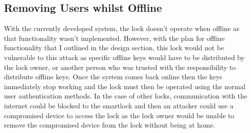 \subsection{Removing Users whilst Offline}
With the currently developed system, the lock doesn't operate when offline as that functionality wasn't implemented. However, with the plan for offline functionality that I outlined in the design section, this lock would not be vulnerable to this attack as specific offline keys would have to be distributed by the lock owner, or another person who was trusted with the responsibility to distribute offline keys. Once the system comes back online then the keys immediately stop working and the lock must then be operated using the normal user authentication methods. In the case of other locks, communication with the internet could be blocked to the smartlock and then an attacker could use a compromised device to access the lock as the lock owner would be unable to remove the compromised device from the lock without being at home.